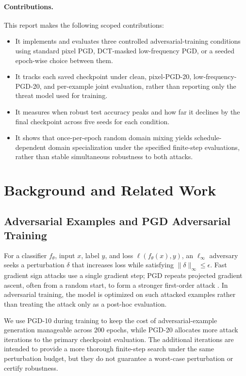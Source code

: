 \documentclass{article}
\newcommand{\linf}{\ell_\infty}
\begin{document}
\paragraph{Contributions.}
This report makes the following scoped contributions:
\begin{itemize}
  \item It implements and evaluates three controlled adversarial-training
  conditions using standard pixel PGD, DCT-masked low-frequency PGD, or a
  seeded epoch-wise choice between them.
  \item It tracks each saved checkpoint under clean, pixel-PGD-20,
  low-frequency-PGD-20, and per-example joint evaluation, rather than
  reporting only the threat model used for training.
  \item It measures when robust test accuracy peaks and how far it declines
  by the final checkpoint across five seeds for each condition.
  \item It shows that once-per-epoch random domain mixing yields
  schedule-dependent domain specialization under the specified finite-step
  evaluations, rather than stable simultaneous robustness to both attacks.
\end{itemize}

\section{Background and Related Work}
\label{sec:related-work}

\subsection{Adversarial Examples and PGD Adversarial Training}
For a classifier $f_\theta$, input $x$, label $y$, and loss
$\ell(f_\theta(x),y)$, an $\linf$ adversary seeks a perturbation $\delta$
that increases loss while satisfying $\lVert\delta\rVert_\infty\leq\epsilon$.
Fast gradient sign attacks use a single gradient step; PGD repeats projected
gradient ascent, often from a random start, to form a stronger first-order
attack \citep{goodfellow2015,madry2018}. In adversarial training, the model is
optimized on such attacked examples rather than treating the attack only as a
post-hoc evaluation.

We use PGD-10 during training to keep the cost of adversarial-example
generation manageable across 200 epochs, while PGD-20 allocates more attack
iterations to the primary checkpoint evaluation. The additional iterations
are intended to provide a more thorough finite-step search under the same
perturbation budget, but they do not guarantee a worst-case perturbation or
certify robustness.
\end{document}
